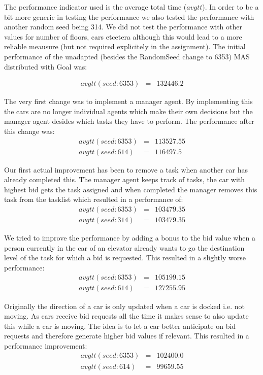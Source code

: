 \documentclass[a4paper,11pt]{article}
\begin{document}
\pagebreak

The performance indicator used is the average total time ($avgtt$). In order to be a bit more generic in testing the performance we also tested the performance with another random seed being 314. We did not test the performance with other values for number of floors, cars etcetera although this would lead to a more reliable meausure (but not required explicitely in the assignment).
\newline\newline
The initial performance of the unadapted (besides the RandomSeed change to 6353) MAS distributed with Goal was:

\[\begin{array}{lcl}
avgtt (seed: 6353) & = & 132446.2
\end{array}\]

The very first change was to implement a manager agent. By implementing this the cars are no longer individual agents which make their own decisions but the manager agent desides which tasks they have to perform. The performance after this change was:
\[\begin{array}{lcl}
avgtt (seed: 6353) & = & 113527.55\\
avgtt (seed: 614) & = & 116497.5
\end{array}\]


Our first actual improvement has been to remove a task when another car has already completed this. The manager agent keeps track of tasks, the car with highest bid gets the task assigned and when completed the manager removes this task from the tasklist which resulted in a performance of:
\[\begin{array}{lcl}
avgtt (seed: 6353) & = & 103479.35\\
avgtt (seed: 314) & = & 103479.35
\end{array}\]

We tried to improve the performance by adding a bonus to the bid value when a person currently in the car of an elevator already wants to go the destination level of the task for which a bid is requested. This resulted in a slightly worse performance:
\[\begin{array}{lcl}
avgtt (seed: 6353) & = & 105199.15\\
avgtt (seed: 614) & = & 127255.95
\end{array}\]

Originally the direction of a car is only updated when a car is docked i.e. not moving. As cars receive bid requests all the time it makes sense to also update this while a car is moving. The idea is to let a car better anticipate on bid requests and therefore generate higher bid values if relevant. This resulted in a performance improvement: 
\[\begin{array}{lcl}
avgtt (seed: 6353) & = & 102400.0\\
avgtt (seed: 614) & = & 99659.55
\end{array}\]
\end{document}
